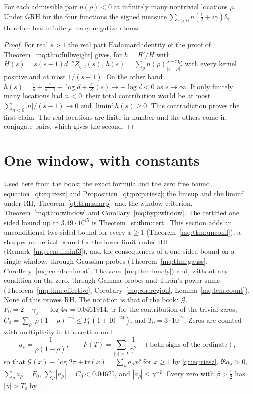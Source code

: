 \begin{proposition}\label{mq:prop:negatoms}
For each admissible pair $n(\rho)<0$ at infinitely many nontrivial locations $\rho$. Under GRH for the four functions the signed measure $\sum_{\gamma>0}n(\tfrac12+i\gamma)\delta_\gamma$ therefore has infinitely many negative atoms.
\end{proposition}

\begin{proof}
For real $s>1$ the real part Hadamard identity of the proof of Theorem~\ref{mq:thm:fullweight} gives, for $h=H'/H$ with $H(s)=s(s-1)d^{-s}Z_{q,d}(s)$, $h(s)=\sum_\rho n(\rho)\frac{s-\Re\rho}{|s-\rho|^2}$ with every kernel positive and at most $1/(s-1)$. On the other hand $h(s)=\frac1s+\frac1{s-1}-\log d+\frac{Z'}Z(s)\to-\log d<0$ as $s\to\infty$. If only finitely many locations had $n<0$, their total contribution would be at most $\sum_{n<0}|n|/(s-1)\to0$ and $\liminf h(s)\ge0$. This contradiction proves the first claim. The real locations are finite in number and the others come in conjugate pairs, which gives the second.
\end{proof}

\section{One window, with constants}\label{mq:sec:onewindow}

Used here from the book: the exact formula and the zero free bound, equation~\eqref{qt:eq:riesz} and Proposition~\ref{qt:prop:riesz}; the limsup and the liminf under RH, Theorem~\ref{qt:thm:sharp}; and the window criterion, Theorem~\ref{mq:thm:window} and Corollary~\ref{mq:hyp:window}. The certified one sided bound up to $3.49\cdot10^{45}$ is Theorem~\ref{st:thm:cert}. This section adds an unconditional two sided bound for every $x\ge1$ (Theorem~\ref{mq:thm:uncond}), a sharper numerical bound for the lower limit under RH (Remark~\ref{mq:rem:liminf3}), and the consequences of a one sided bound on a single window, through Gaussian probes (Theorem~\ref{mq:thm:gauss}, Corollary~\ref{mq:cor:dominant}, Theorem~\ref{mq:thm:lonely}) and, without any condition on the zero, through Gamma probes and Tur\'an's power sums (Theorem~\ref{mq:thm:effective}, Corollary~\ref{mq:cor:region}, Lemma~\ref{mq:lem:count}). None of this proves RH. The notation is that of the book: $\mathcal G$, $F_0=2+\gamma_E-\log4\pi=0.0461914$, $\mathrm{tr}$ for the contribution of the trivial zeros, $C_0=\sum_\rho|\rho(1-\rho)|^{-1}\le F_0(1+10^{-24})$, and $T_0=3\cdot10^{12}$. Zeros are counted with multiplicity in this section and
\[
a_\rho=\frac1{\rho(1-\rho)},\qquad F(T)=\sum_{|\gamma|>T}\frac1{\gamma^2}\quad(\text{both signs of the ordinate}),
\]
so that $\mathcal G(x)-\log2\pi+\mathrm{tr}(x)=\sum_\rho a_\rho x^\rho$ for $x\ge1$ by \eqref{qt:eq:riesz}, $\Re a_\rho>0$, $\sum_\rho a_\rho=F_0$, $\sum_\rho|a_\rho|=C_0<0.04620$, and $|a_\rho|\le\gamma^{-2}$. Every zero with $\beta>\frac12$ has $|\gamma|>T_0$ by \cite{PT21}.

